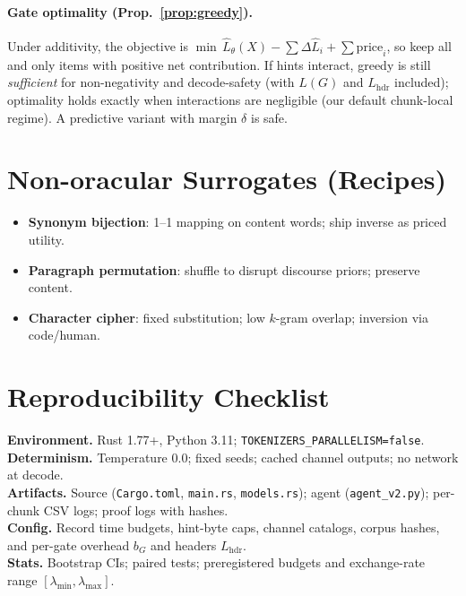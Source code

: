 \documentclass[12pt,a4paper]{article}
\begin{document}
\paragraph{Gate optimality (Prop.~\ref{prop:greedy}).}
Under additivity, the objective is $\min \, \widehat{L}_\theta(X) - \sum \Delta \widehat{L}_i + \sum \mathrm{price}_i$, so keep all and only items with positive net contribution. If hints interact, greedy is still \emph{sufficient} for non-negativity and decode-safety (with $L(G)$ and $L_{\mathrm{hdr}}$ included); optimality holds exactly when interactions are negligible (our default chunk-local regime). A predictive variant with margin $\delta$ is safe.

\section{Non-oracular Surrogates (Recipes)}
\label{app:surrogates}
\begin{itemize}
\item \textbf{Synonym bijection}: 1--1 mapping on content words; ship inverse as priced utility.
\item \textbf{Paragraph permutation}: shuffle to disrupt discourse priors; preserve content.
\item \textbf{Character cipher}: fixed substitution; low $k$-gram overlap; inversion via code/human.
\end{itemize}

\section{Reproducibility Checklist}
\label{app:repro}
\textbf{Environment.} Rust 1.77+, Python 3.11; \texttt{TOKENIZERS\_PARALLELISM=false}.\\
\textbf{Determinism.} Temperature 0.0; fixed seeds; cached channel outputs; no network at decode.\\
\textbf{Artifacts.} Source (\texttt{Cargo.toml}, \texttt{main.rs}, \texttt{models.rs}); agent (\texttt{agent\_v2.py}); per-chunk CSV logs; proof logs with hashes.\\
\textbf{Config.} Record time budgets, hint-byte caps, channel catalogs, corpus hashes, and per-gate overhead $b_G$ and headers $L_{\mathrm{hdr}}$.\\
\textbf{Stats.} Bootstrap CIs; paired tests; preregistered budgets and exchange-rate range $[\lambda_{\min},\lambda_{\max}]$.



\end{document}
